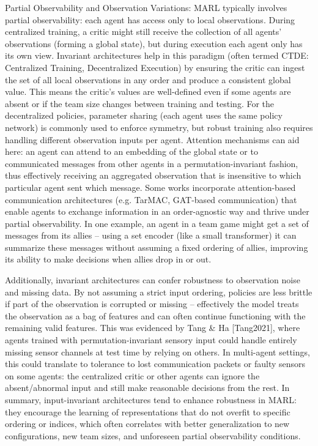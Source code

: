\documentclass{article}
\begin{document}
Partial Observability and Observation Variations: MARL typically involves partial observability: each agent has access only to local observations. During centralized training, a critic might still receive the collection of all agents’ observations (forming a global state), but during execution each agent only has its own view. Invariant architectures help in this paradigm (often termed CTDE: Centralized Training, Decentralized Execution) by ensuring the critic can ingest the set of all local observations in any order and produce a consistent global value. This means the critic’s values are well-defined even if some agents are absent or if the team size changes between training and testing. For the decentralized policies, parameter sharing (each agent uses the same policy network) is commonly used to enforce symmetry, but robust training also requires handling different observation inputs per agent. Attention mechanisms can aid here: an agent can attend to an embedding of the global state or to communicated messages from other agents in a permutation-invariant fashion, thus effectively receiving an aggregated observation that is insensitive to which particular agent sent which message. Some works incorporate attention-based communication architectures (e.g. TarMAC, GAT-based communication) that enable agents to exchange information in an order-agnostic way and thrive under partial observability. In one example, an agent in a team game might get a set of messages from its allies – using a set encoder (like a small transformer) it can summarize these messages without assuming a fixed ordering of allies, improving its ability to make decisions when allies drop in or out.

Additionally, invariant architectures can confer robustness to observation noise and missing data. By not assuming a strict input ordering, policies are less brittle if part of the observation is corrupted or missing – effectively the model treats the observation as a bag of features and can often continue functioning with the remaining valid features. This was evidenced by Tang \& Ha [Tang2021], where agents trained with permutation-invariant sensory input could handle entirely missing sensor channels at test time by relying on others. In multi-agent settings, this could translate to tolerance to lost communication packets or faulty sensors on some agents: the centralized critic or other agents can ignore the absent/abnormal input and still make reasonable decisions from the rest. In summary, input-invariant architectures tend to enhance robustness in MARL: they encourage the learning of representations that do not overfit to specific ordering or indices, which often correlates with better generalization to new configurations, new team sizes, and unforeseen partial observability conditions.
\end{document}
